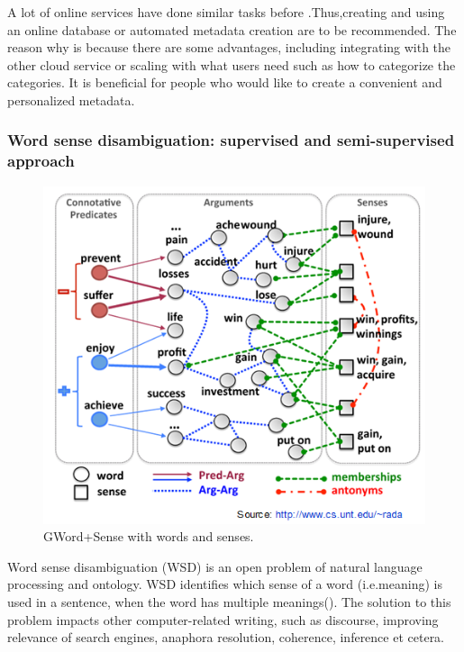 A lot of online services have done similar tasks before .Thus,creating and using an online database or automated metadata creation are to be recommended. The reason why is because there are some advantages, including integrating with the other cloud service or scaling with what users need such as how to categorize the categories. It is beneficial for people who would like to create a convenient and personalized metadata.    \\

\subsubsection*{Word sense disambiguation: supervised and semi-supervised approach}

\begin{figure}[tbh]
	\begin{center}
		\includegraphics[width=\columnwidth]{union(WSD)}
	\end{center}
	\caption{GWord+Sense with words and senses. \label{fig1}}
\end{figure}

Word sense disambiguation (WSD) is an open problem of natural language processing and ontology. WSD identifies which sense of a word (i.e.meaning) is used in a sentence, when the word has multiple meanings(\cite{Du2013}). The solution to this problem impacts other computer-related writing, such as discourse, improving relevance of search engines, anaphora resolution, coherence, inference et cetera.

